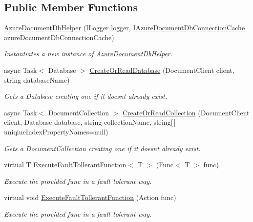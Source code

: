 \subsection*{Public Member Functions}
\begin{DoxyCompactItemize}
\item 
\hyperlink{classCqrs_1_1Azure_1_1DocumentDb_1_1AzureDocumentDbHelper_af6557961f9bfc7685a1197d5fd40a35e_af6557961f9bfc7685a1197d5fd40a35e}{Azure\+Document\+Db\+Helper} (I\+Logger logger, \hyperlink{interfaceCqrs_1_1Azure_1_1DocumentDb_1_1IAzureDocumentDbConnectionCache}{I\+Azure\+Document\+Db\+Connection\+Cache} azure\+Document\+Db\+Connection\+Cache)
\begin{DoxyCompactList}\small\item\em Instantiates a new instance of \hyperlink{classCqrs_1_1Azure_1_1DocumentDb_1_1AzureDocumentDbHelper}{Azure\+Document\+Db\+Helper}. \end{DoxyCompactList}\item 
async Task$<$ Database $>$ \hyperlink{classCqrs_1_1Azure_1_1DocumentDb_1_1AzureDocumentDbHelper_ad16ab0ecb4524057ddb2f8e67043179f_ad16ab0ecb4524057ddb2f8e67043179f}{Create\+Or\+Read\+Database} (Document\+Client client, string database\+Name)
\begin{DoxyCompactList}\small\item\em Gets a Database creating one if it doesn\textquotesingle{}t already exist. \end{DoxyCompactList}\item 
async Task$<$ Document\+Collection $>$ \hyperlink{classCqrs_1_1Azure_1_1DocumentDb_1_1AzureDocumentDbHelper_a5dd4b71b321017034c3d5c651017a068_a5dd4b71b321017034c3d5c651017a068}{Create\+Or\+Read\+Collection} (Document\+Client client, Database database, string collection\+Name, string\mbox{[}$\,$\mbox{]} uniqiue\+Index\+Property\+Names=null)
\begin{DoxyCompactList}\small\item\em Gets a Document\+Collection creating one if it doesn\textquotesingle{}t already exist. \end{DoxyCompactList}\item 
virtual T \hyperlink{classCqrs_1_1Azure_1_1DocumentDb_1_1AzureDocumentDbHelper_a470fcc86befa4a28725ad53e715a223c_a470fcc86befa4a28725ad53e715a223c}{Execute\+Fault\+Tollerant\+Function$<$ T $>$} (Func$<$ T $>$ func)
\begin{DoxyCompactList}\small\item\em Execute the provided {\itshape func}  in a fault tolerant way. \end{DoxyCompactList}\item 
virtual void \hyperlink{classCqrs_1_1Azure_1_1DocumentDb_1_1AzureDocumentDbHelper_a334337444ff416c9f4ce48ec61e60a83_a334337444ff416c9f4ce48ec61e60a83}{Execute\+Fault\+Tollerant\+Function} (Action func)
\begin{DoxyCompactList}\small\item\em Execute the provided {\itshape func}  in a fault tolerant way. \end{DoxyCompactList}\end{DoxyCompactItemize}
